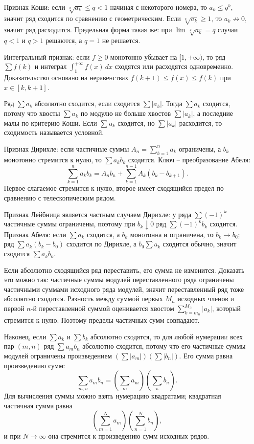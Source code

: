 \documentclass[12pt,a4paper]{article}
\begin{document}
Признак Коши: если \(\sqrt[k]{a_k}\le q<1\) начиная с некоторого номера, то
\(a_k\le q^k\), значит ряд сходится по сравнению с геометрическим. Если
\(\sqrt[k]{a_k}\ge1\), то \(a_k\not\to0\), значит ряд расходится. Предельная
форма такая же: при \(\lim\sqrt[k]{a_k}=q\) случаи \(q<1\) и \(q>1\) решаются,
а \(q=1\) не решается.

Интегральный признак: если \(f\ge0\) монотонно убывает на
\([1,+\infty)\), то ряд \(\sum f(k)\) и интеграл
\(\int_1^{+\infty}f(x)\,dx\) сходятся или расходятся одновременно. Доказательство
основано на неравенствах \(f(k+1)\le f(x)\le f(k)\) при \(x\in[k,k+1]\).

Ряд \(\sum a_k\) абсолютно сходится, если сходится \(\sum |a_k|\). Тогда
\(\sum a_k\) сходится, потому что хвосты \(\sum a_k\) по модулю не больше
хвостов \(\sum |a_k|\), а последние малы по критерию Коши. Если \(\sum a_k\)
сходится, но \(\sum |a_k|\) расходится, то сходимость называется условной.

Признак Дирихле: если частичные суммы \(A_n=\sum_{k=1}^{n}a_k\) ограничены,
а \(b_k\) монотонно стремится к нулю, то \(\sum a_kb_k\) сходится. Ключ --
преобразование Абеля:
\[
  \sum_{k=1}^{n}a_kb_k
  =
  A_n b_n+\sum_{k=1}^{n-1}A_k(b_k-b_{k+1}).
\]
Первое слагаемое стремится к нулю, второе имеет сходящийся предел по
сравнению с телескопическим рядом.

Признак Лейбница является частным случаем Дирихле: у ряда
\(\sum (-1)^k\) частичные суммы ограничены, поэтому при \(b_k\downarrow0\)
ряд \(\sum(-1)^k b_k\) сходится. Признак Абеля: если \(\sum a_k\) сходится,
а \(b_k\) монотонна и ограничена, то \(b_k\to b_0\); ряд
\(\sum a_k(b_k-b_0)\) сходится по Дирихле, а \(b_0\sum a_k\) сходится
обычно, значит сходится \(\sum a_kb_k\).

Если абсолютно сходящийся ряд переставить, его сумма не изменится. Доказать
это можно так: частичные суммы модулей переставленного ряда ограничены
частичными суммами исходного ряда модулей, значит переставленный ряд тоже
абсолютно сходится. Разность между суммой первых \(M_n\) исходных членов и
первой \(n\)-й переставленной суммой оценивается хвостом
\(\sum_{k=m_n}^{M_n}|a_k|\), который стремится к нулю. Поэтому пределы
частичных сумм совпадают.

Наконец, если \(\sum a_k\) и \(\sum b_k\) абсолютно сходятся, то для любой
нумерации всех пар \((m,n)\) ряд \(\sum a_m b_n\) абсолютно сходится, потому
что его частичные суммы модулей ограничены произведением
\((\sum |a_m|)(\sum |b_n|)\). Его сумма равна произведению сумм:
\[
  \sum_{m,n}a_m b_n
  =
  \left(\sum_m a_m\right)\left(\sum_n b_n\right).
\]
Для вычисления суммы можно взять нумерацию квадратами; квадратная частичная
сумма равна
\[
  \left(\sum_{m=1}^{N}a_m\right)\left(\sum_{n=1}^{N}b_n\right),
\]
и при \(N\to\infty\) она стремится к произведению сумм исходных рядов.
\end{document}

